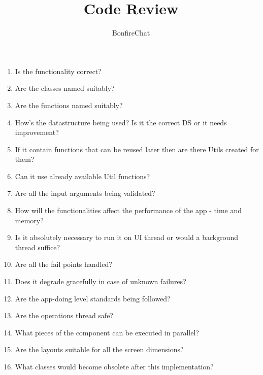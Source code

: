 \documentclass[accentcolor=tud2d,12pt,paper=a4,colorbacktitle]{tudexercise}
\title{Code Review}
\subtitle{BonfireChat}
\begin{document}
  \maketitle

  \begin{enumerate}
    \item Is the functionality correct?
    \item Are the classes named suitably?
    \item Are the functions named suitably?
    \item How's the datastructure being used? Is it the correct DS or it needs improvement?
    \item If it contain functions that can be reused later then are there Utils created for them?
    \item Can it use already available Util functions?
    \item Are all the input arguments being validated?
    \item How will the functionalities affect the performance of the app - time and memory?
    \item Is it absolutely necessary to run it on UI thread or would a background thread suffice?
    \item Are all the fail points handled?
    \item Does it degrade gracefully in case of unknown failures?
    \item Are the app-doing level standards being followed?
    \item Are the operations thread safe?
    \item What pieces of the component can be executed in parallel?
    \item Are the layouts suitable for all the screen dimensions?
    \item What classes would become obsolete after this implementation?
  \end{enumerate}
\end{document}
